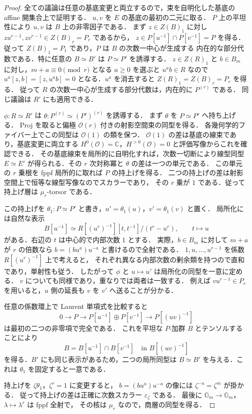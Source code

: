 \begin{proof}
全ての議論は任意の基底変更と両立するので，束を自明化した基底の affine 開集合上で証明する．
$u,v$ を $E$ の基底の最初の二元に取る．
$P$ 上の平坦性により $u,v$ は $B$ 上の非零因子である．
まず $z\in Z(B)_1$ に対し
$zu^{r-1},zv^{r-1}\in Z(B)_r=P_r$ であるから，
$z\in P[u^{-1}]\cap P[v^{-1}]=P$ を得る．
従って $Z(B)_1=P_1$ であり，$P$ は $B$ の次数一中心が生成する
内在的な部分代数である．特に任意の $B\simeq B'$ は $P\simeq P'$ を誘導する．
$z\in Z(R)_1$ と $b\in B_m$ に対し，$m+a\equiv0\pmod r$ となる
$a\ge0$ を選ぶと $u^ab\in R$ なので
$u^a[z,b]=[z,u^ab]=0$ となる．$u^a$ を消去すると
$Z(R)_1=Z(B)_r=P_r$ を得る．
従って $R$ の次数一中心が生成する部分代数は，内在的に $P^{(r)}$ である．
同じ議論は $R'$ にも適用できる．

$\phi:R\simeq R'$ は $\theta:P^{(r)}\simeq(P')^{(r)}$ を誘導する．
まず $\theta$ を $P\simeq P'$ へ持ち上げる．
Proj を取ると偏極 $\mathcal O(r)$ 付きの射影空間束の同型を得る．
各幾何学的ファイバー上でこの同型は $\mathcal O(1)$ の類を保つ．
$\mathcal O(1)$ の差は基底の線束であり，基底変更に両立する
$H^0(\mathcal O)=\mathbb C$，$H^{>0}(\mathcal O)=0$ と評価写像からこれを確認できる．
その基底線束を局所的に自明化すれば，次数一切断により線型同型
$E\simeq E'$ が得られる．その $r$ 次対称冪と $\theta$ の差は一つの単元である．
この単元の $r$ 乗根を fppf 局所的に取れば $P$ の持上げを得る．
二つの持上げの差は射影空間上で恒等な線型写像なのでスカラーであり，
その $r$ 乗が $1$ である．従って持上げ層は $\mu_r$-torsor である．

この持上げを $\theta_1:P\simeq P'$ と書き，$u'=\theta_1(u)$，$v'=\theta_1(v)$ と置く．
局所化には自然な表示
\[
 B[u^{-1}]
 \simeq
 R[(u^r)^{-1}][t,t^{-1}]/(t^r-u^r),\qquad t\longmapsto u
\]
がある．右辺の $t$ は中心的で内部次数 $1$ とする．
実際，$b\in B_m$ に対して $m+a$ が $r$ の倍数なら
$b=(bu^a)u^{-a}$ と書けるので全射である．
$1,u,\ldots,u^{r-1}$ を係数 $R[(u^r)^{-1}]$ 上で考えると，
それぞれ異なる内部次数の剰余類を持つので直和であり，単射性も従う．
したがって $\phi$ と $u\mapsto u'$ は局所化の同型を一意に定める．
$v$ についても同様であり，重なりでは両者は一致する．
例えば $vu^{r-1}\in P_r$ を用いると，$u$ 側の延長も $v$ を $v'$ へ送ることが分かる．

任意の係数環上で Laurent 単項式を比較すると
\[
 0\longrightarrow P\longrightarrow
 P[u^{-1}]\oplus P[v^{-1}]
 \longrightarrow P[(uv)^{-1}]
\]
は最初の二つの非零項で完全である．
これを平坦な $P$-加群 $B$ とテンソルすることにより
\[
 B=B[u^{-1}]\cap B[v^{-1}]
 \quad\text{in }B[(uv)^{-1}]
\]
を得る．$B'$ にも同じ表示があるため，二つの局所同型は
$B\simeq B'$ を与える．これは $\theta_1$ を固定すると一意である．

持上げを $\zeta\theta_1$，$\zeta^r=1$ に変更すると，
$b=(bu^a)u^{-a}$ の像には $\zeta^{-a}=\zeta^m$ が掛かる．
従って持上げの差は正確に次数スカラー $\varepsilon_\zeta$ である．
最後に $\mathbb G_m\to\mathbb G_m$，$\lambda\mapsto\lambda^r$ は fppf 全射で，
その核は $\mu_r$ なので，商層の同型を得る．
\end{proof}

